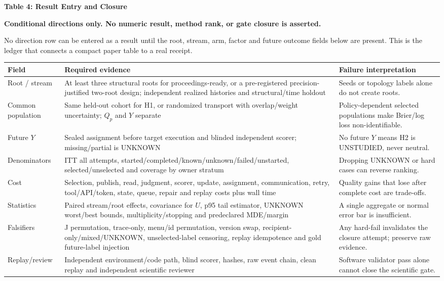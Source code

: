 \documentclass[10pt,a4paper]{article}
\newcommand{\caution}{\textcolor{red!70!black}{\textbf{Conditional directions only. No numeric result, method rank, or gate closure is asserted.}}\par}
\begin{document}
\clearpage
{\large\bfseries Table 4: Result Entry and Closure}\par\caution
No direction row can be entered as a result until the root, stream, arm, factor and
future outcome fields below are present. This is the ledger that connects a compact
paper table to a real receipt.

\begin{center}\scriptsize
\begin{tabularx}{\linewidth}{@{}L{.19\linewidth}X L{.24\linewidth}@{}}\toprule
Field & Required evidence & Failure interpretation\\\midrule
Root / stream & At least three structural roots for proceedings-ready, or a pre-registered precision-justified two-root design; independent realized histories and structural/time holdout & Seeds or topology labels alone do not create roots.\\
Common population & Same held-out cohort for H1, or randomized transport with overlap/weight uncertainty; $Q_p$ and $Y$ separate & Policy-dependent selected populations make Brier/log loss non-identifiable.\\
Future $Y$ & Sealed assignment before target execution and blinded independent scorer; missing/partial is UNKNOWN & No future $Y$ means H2 is UNSTUDIED, never neutral.\\
Denominators & ITT all attempts, started/completed/known/unknown/failed/unstarted, selected/unselected and coverage by owner stratum & Dropping UNKNOWN or hard cases can reverse ranking.\\
Cost & Selection, publish, read, judgment, scorer, update, assignment, communication, retry, tool/API/token, state, queue, repair and replay costs plus wall time & Quality gains that lose after complete cost are trade-offs.\\
Statistics & Paired stream/root effects, covariance for $U$, p95 tail estimator, UNKNOWN worst/best bounds, multiplicity/stopping and predeclared MDE/margin & A single aggregate or normal error bar is insufficient.\\
Falsifiers & J permutation, trace-only, menu/id permutation, version swap, recipient-only/mixed/UNKNOWN, unselected-label censoring, replay idempotence and gold future-label injection & Any hard-fail invalidates the closure attempt; preserve raw evidence.\\
Replay/review & Independent environment/code path, blind scorer, hashes, raw event chain, clean replay and independent scientific reviewer & Software validator pass alone cannot close the scientific gate.\\\bottomrule
\end{tabularx}\end{center}
\end{document}
